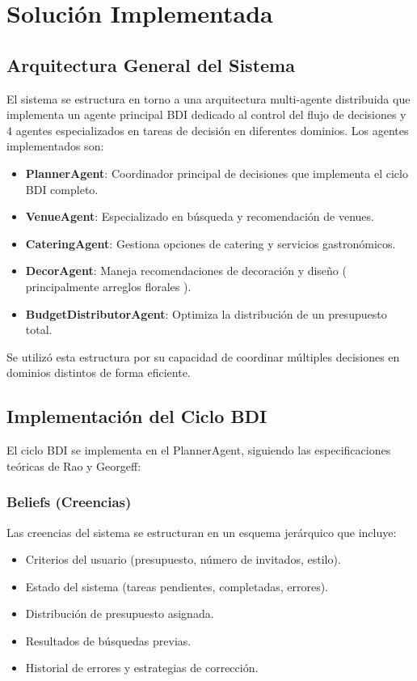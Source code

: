 \documentclass[runningheads,a4paper]{llncs}
\begin{document}
\section{Solución Implementada}

\subsection{Arquitectura General del Sistema}

El sistema se estructura en torno a una arquitectura multi-agente distribuida que implementa un agente principal BDI dedicado al control del flujo de decisiones y 4 agentes especializados en tareas de decisión en diferentes dominios. Los agentes implementados son:

\begin{itemize}
    \item \textbf{PlannerAgent}: Coordinador principal de decisiones que implementa el ciclo BDI completo.
    \item \textbf{VenueAgent}: Especializado en búsqueda y recomendación de venues.
    \item \textbf{CateringAgent}: Gestiona opciones de catering y servicios gastronómicos.
    \item \textbf{DecorAgent}: Maneja recomendaciones de decoración y diseño ( principalmente arreglos florales ).
    \item \textbf{BudgetDistributorAgent}: Optimiza la distribución de un presupuesto total.
\end{itemize}

Se utilizó esta estructura por su capacidad de coordinar múltiples decisiones en dominios distintos de forma eficiente.

\subsection{Implementación del Ciclo BDI}

El ciclo BDI se implementa en el PlannerAgent, siguiendo las especificaciones teóricas de Rao y Georgeff:

\subsubsection{Beliefs (Creencias)}
Las creencias del sistema se estructuran en un esquema jerárquico que incluye:
\begin{itemize}
    \item Criterios del usuario (presupuesto, número de invitados, estilo).
    \item Estado del sistema (tareas pendientes, completadas, errores).
    \item Distribución de presupuesto asignada.
    \item Resultados de búsquedas previas.
    \item Historial de errores y estrategias de corrección.
\end{itemize}
\end{document}
